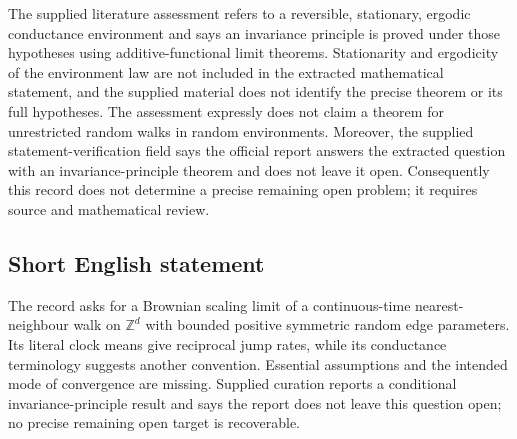 \documentclass[11pt]{article}
\newcommand{\Z}{\mathbb{Z}}
\begin{document}
The supplied literature assessment refers to a reversible, stationary, ergodic conductance environment and says an invariance principle is proved under those hypotheses using additive-functional limit theorems. Stationarity and ergodicity of the environment law are not included in the extracted mathematical statement, and the supplied material does not identify the precise theorem or its full hypotheses. The assessment expressly does not claim a theorem for unrestricted random walks in random environments. Moreover, the supplied statement-verification field says the official report answers the extracted question with an invariance-principle theorem and does not leave it open. Consequently this record does not determine a precise remaining open problem; it requires source and mathematical review.
\subsection{Short English statement}
The record asks for a Brownian scaling limit of a continuous-time nearest-neighbour walk on \(\Z^d\) with bounded positive symmetric random edge parameters. Its literal clock means give reciprocal jump rates, while its conductance terminology suggests another convention. Essential assumptions and the intended mode of convergence are missing. Supplied curation reports a conditional invariance-principle result and says the report does not leave this question open; no precise remaining open target is recoverable.
\end{document}
